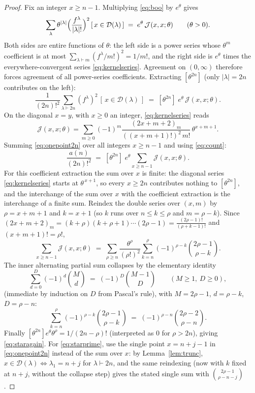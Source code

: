 \documentclass[11pt]{article}
\theoremstyle{plain}
\theoremstyle{definition}
\theoremstyle{remark}
\newcommand{\Dset}{\mathcal{D}}
\newcommand{\JJ}{\mathcal{J}}
\begin{document}
\begin{proof}
Fix an integer $x\ge n-1$. Multiplying \eqref{eq:boo} by $e^{\theta}$ gives
\[
  \sum_{\lambda}\theta^{|\lambda|}\Bigl(\frac{f^\lambda}{|\lambda|!}\Bigr)^{2}
  \,[\,x\in\Dset(\lambda)\,]
  \;=\;e^{\theta}\,\JJ(x,x;\theta)\qquad(\theta>0).
\]
Both sides are entire functions of $\theta$: the left side is a power series whose $\theta^m$
coefficient is at most $\sum_{\lambda\vdash m}(f^\lambda/m!)^2=1/m!$, and the right side is
$e^\theta$ times the everywhere-convergent series \eqref{eq:kernelseries}. Agreement on
$(0,\infty)$ therefore forces agreement of all power-series coefficients. Extracting
$[\theta^{2n}]$ (only $|\lambda|=2n$ contributes on the left):
\begin{equation}\label{eq:onepoint2n}
  \frac{1}{(2n)!^{2}}\sum_{\lambda\vdash2n}(f^\lambda)^2\,[\,x\in\Dset(\lambda)\,]
  \;=\;[\theta^{2n}]\;e^\theta\,\JJ(x,x;\theta).
\end{equation}
On the diagonal $x=y$, with $x\ge0$ an integer, \eqref{eq:kernelseries} reads
\[
\JJ(x,x;\theta)=\sum_{m\ge0}(-1)^m\frac{(2x+m+2)_m}{((x+m+1)!)^{2}\,m!}\,\theta^{x+m+1}.
\]
Summing \eqref{eq:onepoint2n} over all integers $x\ge n-1$ and using \eqref{eq:count}:
\[
  \frac{a(n)}{(2n)!^{2}}\;=\;[\theta^{2n}]\;e^\theta \sum_{x\ge n-1}\JJ(x,x;\theta).
\]
For this coefficient extraction the sum over $x$ is finite: the diagonal series
\eqref{eq:kernelseries} starts at $\theta^{\,x+1}$, so every $x\ge 2n$ contributes nothing to
$[\theta^{2n}]$, and the interchange of the sum over $x$ with the coefficient extraction is the
interchange of a finite sum. Reindex the double series over $(x,m)$ by $\rho=x+m+1$ and $k=x+1$
(so $k$ runs over $n\le k\le\rho$ and $m=\rho-k$). Since
$(2x+m+2)_m=(k+\rho)(k+\rho+1)\cdots(2\rho-1)=\frac{(2\rho-1)!}{(\rho+k-1)!}$ and
$(x+m+1)!=\rho!$,
\[
  \sum_{x\ge n-1}\JJ(x,x;\theta)
  \;=\;\sum_{\rho\ge n}\frac{\theta^{\rho}}{(\rho!)^{2}}
  \sum_{k=n}^{\rho}(-1)^{\rho-k}\binom{2\rho-1}{\rho-k}.
\]
The inner alternating partial sum collapses by the elementary identity
\begin{equation}\label{eq:collapse}
  \sum_{d=0}^{D}(-1)^d\binom{M}{d}\;=\;(-1)^D\binom{M-1}{D}
  \qquad(M\ge1,\ D\ge0),
\end{equation}
(immediate by induction on $D$ from Pascal's rule), with $M=2\rho-1$, $d=\rho-k$, $D=\rho-n$:
\[
  \sum_{k=n}^{\rho}(-1)^{\rho-k}\binom{2\rho-1}{\rho-k}\;=\;(-1)^{\rho-n}\binom{2\rho-2}{\rho-n}.
\]
Finally $[\theta^{2n}]e^{\theta}\theta^{\rho}=1/(2n-\rho)!$ (interpreted as $0$ for $\rho>2n$),
giving \eqref{eq:staragain}. For \eqref{eq:starprime}, use the single point $x=n+j-1$ in
\eqref{eq:onepoint2n} instead of the sum over $x$: by Lemma~\ref{lem:trunc},
$x\in\Dset(\lambda)\iff\lambda_1=n+j$ for $\lambda\vdash2n$, and the same reindexing (now with
$k$ fixed at $n+j$, without the collapse step) gives the stated single sum with
$\binom{2\rho-1}{\rho-n-j}$.
\end{proof}
\end{document}

